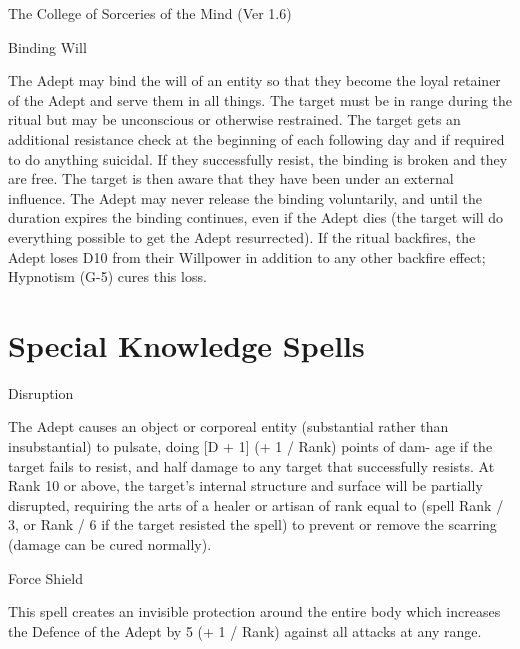 \begin{Chapter}{The College of Sorceries of the Mind (Ver 1.6)}
\begin{ritual}[Q-1]{Binding Will }
\begin{effects}
 The Adept may bind the will of an entity so that they become the
 loyal retainer of the Adept and serve them in all things. The target
 must be in range during the ritual but may be unconscious or
 otherwise restrained.  The target gets an additional resistance check
 at the beginning of each following day and if required to do anything
 suicidal. If they successfully resist, the binding is broken and they
 are free.  The target is then aware that they have been under an
 external influence.  The Adept may never release the binding
 voluntarily, and until the duration expires the binding continues,
 even if the Adept dies (the target will do everything possible to get
 the Adept resurrected). If the ritual backfires, the Adept loses D10
 from their Willpower in addition to any other backfire effect;
 Hypnotism (G-5) cures this loss.
\end{effects}
\end{ritual}

\section{Special Knowledge Spells}

\begin{spell}[S-1]{Disruption }

\begin{effects}
The Adept causes an object or corporeal entity (substantial rather
than insubstantial) to pulsate, doing [D + 1] (+ 1 / Rank) points of
dam- age if the target fails to resist, and half damage to any target
that successfully resists.  At Rank 10 or above, the target’s internal
structure and surface will be partially disrupted, requiring the arts
of a healer or artisan of rank equal to (spell Rank / 3, or Rank / 6
if the target resisted the spell) to prevent or remove the scarring
(damage can be cured normally).
\end{effects}
\end{spell}

\begin{spell}[S-2]{Force Shield }

\begin{effects}
This spell creates an invisible protection around the entire body
which increases the Defence of the Adept by 5 (+ 1 / Rank) against all
attacks at any range.
\end{effects}
\end{spell}


\end{Chapter}
